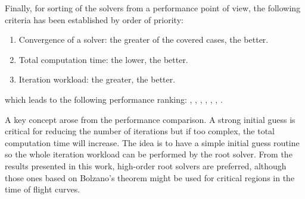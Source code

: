 Finally, for sorting of the solvers from a performance point of view, the
following criteria has been established by order of priority:

\begin{enumerate}
  \item Convergence of a solver: the greater of the covered cases, the better.
  \item Total computation time: the lower, the better.
  \item Iteration workload: the greater, the better.
\end{enumerate}

which leads to the following performance ranking: \cite{izzo2015},
\cite{arora2013}, \cite{gooding1990}, \cite{battin1984}, \cite{avanzini2008},
\cite{vallado2013}, \cite{gauss1809}.

A key concept arose from the performance comparison. A strong initial guess
is critical for reducing the number of iterations but if too complex, the total
computation time will increase. The idea is to have a simple initial guess
routine so the whole iteration workload can be performed by the root solver.
From the results presented in this work, high-order root solvers are preferred,
although those ones based on Bolzano's theorem might be used for critical
regions in the time of flight curves.
